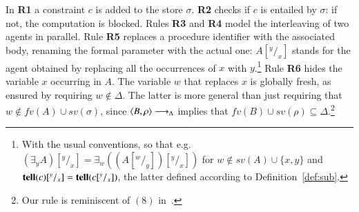\documentclass[main.tex]{subfiles}
\begin{document}
\def\odiv{\, {\ominus\hspace{-7.8pt} \div} \,}
\def\odivvv{\; {\ominus\hspace{-4.7pt} \div} \;}


In {\bf R1} a constraint $c$ is added to the store $\sigma$.
%
{\bf R2} checks if $c$ is entailed by  $\sigma$: if not, the computation is blocked.
%
Rules {\bf  R3}  and {\bf  R4} model the interleaving of two agents in parallel.
%
%
Rule {\bf R5} replaces a procedure identifier with the associated body, renaming the formal parameter with the actual one:
$A[^y/_x]$ stands for the agent obtained by replacing all the occurrences of $x$ with $y$.\footnote{With the usual 
conventions, so that e.g. $(\exists _y A)[^y/_x] = \exists_w ((A[^w/_y])[^y/_x])$ for $w \not \in sv(A) \cup \{x,y\}$
and $\hbox{{\bf tell}}(c)[^y/_x] =  \hbox{{\bf tell}}(c[^y/_x])$, the latter defined according to Definition~\ref{def:sub}.}
%
Rule {\bf R6} hides the variable $x$ occurring in $A$. 
%
The variable $w$ that replaces $x$ is globally fresh,
as ensured by requiring $w \not \in \Delta$.
The latter is more general than just requiring that 
$w \not \in fv(A) \cup sv(\sigma)$, since
$\langle B, \rho \rangle   \longrightarrow_\Delta$ implies that $fv(B) \cup sv(\rho) \subseteq \Delta$.\footnote{Our rule is  reminiscent of $(8)$ in~\cite[p.~342]{popl91}.}
%
%
%
\end{document}
